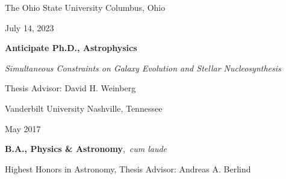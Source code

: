 \documentclass[cv.tex]{subfiles}
\begin{document}
{\color{themecolor}\large The Ohio State University}
\hfill
Columbus, Ohio
\par\noindent
\parbox{0.18\textwidth}{%
	\raggedleft
	July 14, 2023 \par
	\null \par
	\null
}
\hspace{1mm}
\parbox{0.8\textwidth}{%
	\textbf{Anticipate Ph.D., Astrophysics} \par
	\textit{Simultaneous Constraints on Galaxy Evolution and Stellar
	Nucleosynthesis} \par
	Thesis Advisor: David H. Weinberg \par
}
\vspace{2mm}
\par\noindent
{\color{themecolor}\large Vanderbilt University}
\hfill
Nashville, Tennessee
\par\noindent
\parbox{0.18\textwidth}{%
	\raggedleft
	May 2017 \par
	\null
}
\hspace{1mm}
\parbox{0.8\textwidth}{%
	\vspace{1mm}
	\textbf{B.A., Physics \& Astronomy},~\textit{cum laude} \par
	Highest Honors in Astronomy, Thesis Advisor: Andreas A. Berlind
}
\end{document}
